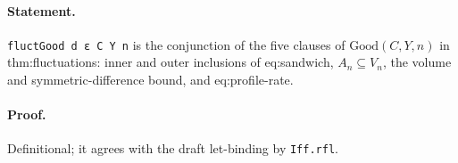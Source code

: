 \paragraph{Statement.} \texttt{fluctGood d ε C Y n} is the conjunction of the five clauses of $\mathrm{Good}(C,Y,n)$ in thm:fluctuations: inner and outer inclusions of eq:sandwich, $A_n\subseteq V_n$, the volume and symmetric-difference bound, and eq:profile-rate.
\paragraph{Proof.} Definitional; it agrees with the draft let-binding by \texttt{Iff.rfl}.
